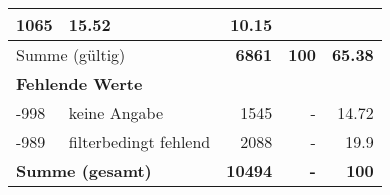 \begin{longtable}{lXrrr}
       \num{1065} &
       \num[round-mode=places,round-precision=2]{15,52} &
         \num[round-mode=places,round-precision=2]{10,15} \\
     \midrule
     \multicolumn{2}{l}{Summe (gültig)} &
       \textbf{\num{6861}} &
     \textbf{100} &
       \textbf{\num[round-mode=places,round-precision=2]{65,38}} \\
     \multicolumn{5}{l}{\textbf{Fehlende Werte}}\\
       -998 &
       keine Angabe &
         \num{1545} &
        - &
         \num[round-mode=places,round-precision=2]{14,72} \\
       -989 &
       filterbedingt fehlend &
         \num{2088} &
        - &
         \num[round-mode=places,round-precision=2]{19,9} \\
     \midrule
     \multicolumn{2}{l}{\textbf{Summe (gesamt)}} &
          \textbf{\num{10494}} &
        \textbf{-} &
        \textbf{100} \\
     \bottomrule
     \end{longtable}
     
